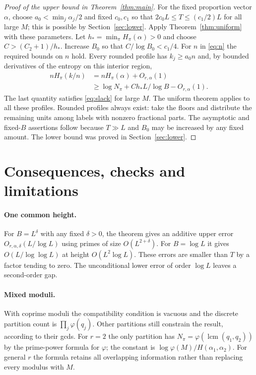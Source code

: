 \documentclass[11pt]{article}
\theoremstyle{definition}\newtheorem{remark}[theorem]{Remark}
\newcommand{\lcm}{\operatorname{lcm}}
\begin{document}
\begin{proof}[Proof of the upper bound in Theorem~\ref{thm:main}]
For the fixed proportion vector $\alpha$, choose $a_0<\min_j\alpha_j/2$ and fixed $c_0,c_1$ so that $2c_0L\le T\le(c_1/2)L$ for all large $M$; this is possible by Section~\ref{sec:lower}. Apply Theorem~\ref{thm:uniform} with these parameters. Let $h_* =\min_\pi H_\pi(\alpha)>0$ and choose $C>(C_2+1)/h_*$. Increase $B_0$ so that $C/\log B_0<c_1/4$. For $n$ in \eqref{eq:n} the required bounds on $n$ hold. Every rounded profile has $k_j\ge a_0 n$ and, by bounded derivatives of the entropy on this interior region,
\begin{align*}
 n H_\pi(k/n)&=n H_\pi(\alpha)+O_{r,\alpha}(1)\\
 &\ge\log N_\pi+C h_* L/\log B-O_{r,\alpha}(1) .
\end{align*}
The last quantity satisfies \eqref{eq:slack} for large $M$. The uniform theorem applies to all these profiles. Rounded profiles always exist: take the floors and distribute the remaining units among labels with nonzero fractional parts. The asymptotic and fixed-$B$ assertions follow because $T\gg L$ and $B_0$ may be increased by any fixed amount. The lower bound was proved in Section~\ref{sec:lower}.
\end{proof}

\section{Consequences, checks and limitations}
\paragraph{One common height.} For $B=L^\delta$ with any fixed $\delta>0$, the theorem gives an additive upper error $O_{r,\alpha,\delta}(L/\log L)$ using primes of size $O(L^{2+\delta})$. For $B=\log L$ it gives $O(L/\log\log L)$ at height $O(L^2\log L)$. These errors are smaller than $T$ by a factor tending to zero. The unconditional lower error of order $\log L$ leaves a second-order gap.

\paragraph{Mixed moduli.} With coprime moduli the compatibility condition is vacuous and the discrete partition count is $\prod_j\varphi(q_j)$. Other partitions still constrain the result, according to their gcds. For $r=2$ the only partition has $N_\pi=\varphi(\lcm(q_1,q_2))$ by the prime-power formula for $\varphi$; the constant is $\log\varphi(M)/H(\alpha_1,\alpha_2)$. For general $r$ the formula retains all overlapping information rather than replacing every modulus with $M$.
\end{document}
